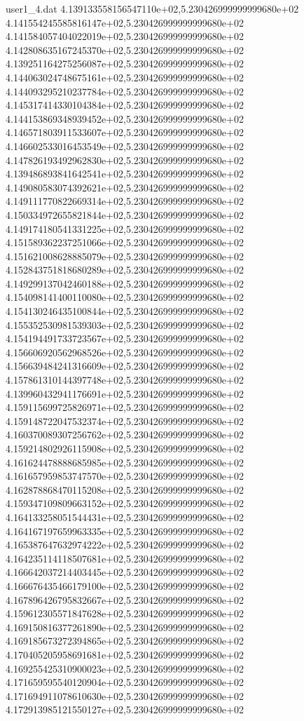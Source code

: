 \begin{filecontents}{user1_4.dat}
4.139133558156547110e+02,5.230426999999999680e+02
4.141554245585816147e+02,5.230426999999999680e+02
4.141584057404022019e+02,5.230426999999999680e+02
4.142808635167245370e+02,5.230426999999999680e+02
4.139251164275256087e+02,5.230426999999999680e+02
4.144063024748675161e+02,5.230426999999999680e+02
4.144093295210237784e+02,5.230426999999999680e+02
4.145317414330104384e+02,5.230426999999999680e+02
4.144153869348939452e+02,5.230426999999999680e+02
4.146571803911533607e+02,5.230426999999999680e+02
4.146602533016453549e+02,5.230426999999999680e+02
4.147826193492962830e+02,5.230426999999999680e+02
4.139486893841642541e+02,5.230426999999999680e+02
4.149080583074392621e+02,5.230426999999999680e+02
4.149111770822669314e+02,5.230426999999999680e+02
4.150334972655821844e+02,5.230426999999999680e+02
4.149174180541331225e+02,5.230426999999999680e+02
4.151589362237251066e+02,5.230426999999999680e+02
4.151621008628885079e+02,5.230426999999999680e+02
4.152843751818680289e+02,5.230426999999999680e+02
4.149299137042460188e+02,5.230426999999999680e+02
4.154098141400110080e+02,5.230426999999999680e+02
4.154130246435100844e+02,5.230426999999999680e+02
4.155352530981539303e+02,5.230426999999999680e+02
4.154194491733723567e+02,5.230426999999999680e+02
4.156606920562968526e+02,5.230426999999999680e+02
4.156639484241316609e+02,5.230426999999999680e+02
4.157861310144397748e+02,5.230426999999999680e+02
4.139960432941176691e+02,5.230426999999999680e+02
4.159115699725826971e+02,5.230426999999999680e+02
4.159148722047532374e+02,5.230426999999999680e+02
4.160370089307256762e+02,5.230426999999999680e+02
4.159214802926115908e+02,5.230426999999999680e+02
4.161624478888685985e+02,5.230426999999999680e+02
4.161657959853747570e+02,5.230426999999999680e+02
4.162878868470115208e+02,5.230426999999999680e+02
4.159347109809663152e+02,5.230426999999999680e+02
4.164133258051544431e+02,5.230426999999999680e+02
4.164167197659963335e+02,5.230426999999999680e+02
4.165387647632974222e+02,5.230426999999999680e+02
4.164235114118507681e+02,5.230426999999999680e+02
4.166642037214403445e+02,5.230426999999999680e+02
4.166676435466179100e+02,5.230426999999999680e+02
4.167896426795832667e+02,5.230426999999999680e+02
4.159612305571847628e+02,5.230426999999999680e+02
4.169150816377261890e+02,5.230426999999999680e+02
4.169185673272394865e+02,5.230426999999999680e+02
4.170405205958691681e+02,5.230426999999999680e+02
4.169255425310900023e+02,5.230426999999999680e+02
4.171659595540120904e+02,5.230426999999999680e+02
4.171694911078610630e+02,5.230426999999999680e+02
4.172913985121550127e+02,5.230426999999999680e+02

\end{filecontents}

